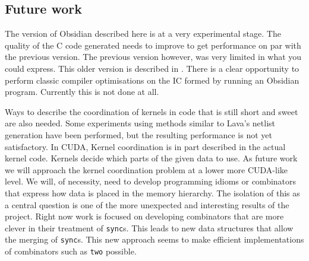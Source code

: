 \subsection{Future work} \label{sec:fut}

The version of Obsidian described here is at a very experimental stage. 
The quality of the C code generated needs to improve to get performance 
on par with the previous version. The previous version however, was very
limited in what you could express. This older version is described in
\cite{JMT}.
There is a clear opportunity to perform classic compiler optimisations on 
the IC formed by running an Obsidian program. Currently this is not done at all. 

Ways to describe the coordination 
of kernels in code that is still short and sweet are also needed. Some experiments using 
methods similar to Lava's netlist generation have been performed, but the
resulting performance is not yet satisfactory. In CUDA, Kernel coordination 
is in part described in the actual kernel code. Kernels decide which parts 
of the given data to use. As future work we will approach the kernel 
coordination problem at a lower more CUDA-like level. We will, of necessity,
need to develop programming idioms or combinators that express how data is 
placed in the memory hierarchy. The isolation of this as a central question 
is one of the more unexpected and interesting results of the project.
Right now work is focused on developing combinators that are more clever 
in their treatment of {\tt sync}s. This leads to new data structures that 
allow the merging of {\tt sync}s. This new approach seems to make efficient
implementations of combinators such as {\tt two} possible. 



